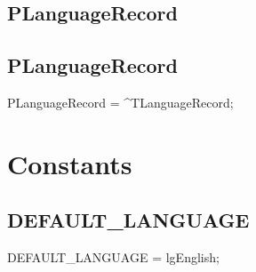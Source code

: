 \documentclass{report}
\newif\ifpdf
\begin{document}
\subsection*{\large{\textbf{PLanguageRecord}}\normalsize\hspace{1ex}\hrulefill}
\else
\subsection*{PLanguageRecord}
\fi
\label{PasDoc_Languages-PLanguageRecord}
\begin{list}{}{
\setlength{\itemindent}{0cm}
\setlength{\listparindent}{0cm}
\setlength{\leftmargin}{\evensidemargin}
\addtolength{\leftmargin}{\tmplength}
\settowidth{\labelsep}{X}
\addtolength{\leftmargin}{\labelsep}
\setlength{\labelwidth}{\tmplength}
}
\item[\textbf{Declaration}\hfill]
\ifpdf
\begin{flushleft}
\fi
\begin{ttfamily}
PLanguageRecord = {\^{}}TLanguageRecord;\end{ttfamily}

\ifpdf
\end{flushleft}
\fi

\end{list}
\section{Constants}
\ifpdf
\subsection*{\large{\textbf{DEFAULT{\_}LANGUAGE}}\normalsize\hspace{1ex}\hrulefill}
\else
\subsection*{DEFAULT{\_}LANGUAGE}
\fi
\label{PasDoc_Languages-DEFAULT_LANGUAGE}
\begin{list}{}{
\setlength{\itemindent}{0cm}
\setlength{\listparindent}{0cm}
\setlength{\leftmargin}{\evensidemargin}
\addtolength{\leftmargin}{\tmplength}
\settowidth{\labelsep}{X}
\addtolength{\leftmargin}{\labelsep}
\setlength{\labelwidth}{\tmplength}
}
\item[\textbf{Declaration}\hfill]
\ifpdf
\begin{flushleft}
\fi
\begin{ttfamily}
DEFAULT{\_}LANGUAGE = lgEnglish;\end{ttfamily}

\ifpdf
\end{flushleft}
\fi

\end{list}
\end{document}
